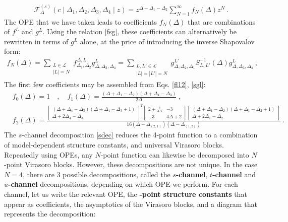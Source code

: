 \documentclass[12pt, a4paper]{article}
\newcommand{\myindex}[1]{\textbf{\boldmath #1}}
\theoremstyle{break}
\begin{document}
\begin{align}
 \mathcal{F}_{\Delta}^{(s)}\left(c\middle|\Delta_1,\Delta_2,\Delta_3,\Delta_4\middle|z\right) =  z^{\Delta-\Delta_1-\Delta_2}\sum_{N=1}^\infty f_N(\Delta)z^N \ .
 \label{fsl}
\end{align}
The OPE that we have taken leads to coefficients $f_N(\Delta)$ that are combinations of $f^L$ and $g^L$. Using the relation \eqref{fsg}, these coefficients can alternatively be rewritten in terms of $g^L$ alone, at the price of introducing the inverse Shapovalov form:
\begin{align}
 f_N(\Delta) = \sum_{\substack{L\in\mathcal{L} \\ |L|=N}} f_{\Delta_1,\Delta_2}^{\Delta,L}g^L_{\Delta,\Delta_3,\Delta_4} = \sum_{\substack{L,L'\in\mathcal{L} \\ |L|=|L'|=N}} g^{L'}_{\Delta,\Delta_2,\Delta_1} S_{L,L'}^{-1}(\Delta) g^L_{\Delta,\Delta_3,\Delta_4} \ ,
 \label{fnd}
\end{align}
The first few coefficients may be assembled from Eqs. \eqref{fl12}, \eqref{sgl}:
\begin{subequations}
\begin{align}
& f_0(\Delta) = 1 \quad , \quad f_1(\Delta) = \frac{(\Delta+\Delta_1-\Delta_2)(\Delta+\Delta_4-\Delta_3)}{2\Delta} \ ,
\\
& f_2(\Delta) =  \frac{\left[\begin{smallmatrix} (\Delta+\Delta_4-\Delta_3)(\Delta+\Delta_4-\Delta_3+1) \\ \Delta+2\Delta_4-\Delta_3 \end{smallmatrix}\right]^T
\left[\begin{smallmatrix} 2+\frac{c}{4\Delta} & -3 \\ -3 & 4\Delta+2 \end{smallmatrix}\right]
\left[\begin{smallmatrix} (\Delta+\Delta_1-\Delta_2)(\Delta+\Delta_1-\Delta_2+1) \\ \Delta+2\Delta_1-\Delta_2 \end{smallmatrix}\right]}{16(\Delta-\Delta_{(2,1)})(\Delta-\Delta_{(1,2)})}
 \ .
 \label{f2d}
\end{align}
\end{subequations}
The $s$-channel decomposition \eqref{sdec} reduces the 4-point function to a combination of model-dependent structure constants, and universal Virasoro blocks. Repeatedly using OPEs, any $N$-point function can likewise be decomposed into $N$-point Virasoro blocks. However, these decompositions are not unique. In the case $N=4$, there are 3 possible decompositions, called the \myindex{$s$-channel}, \myindex{$t$-channel} and \myindex{$u$-channel} decompositions, depending on which OPE we perform. For each channel, let us write the relevant OPE, the \myindex{4-point structure constants} that appear as coefficients, the asymptotics of the Virasoro blocks, and a diagram that represents the decomposition:
\end{document}
